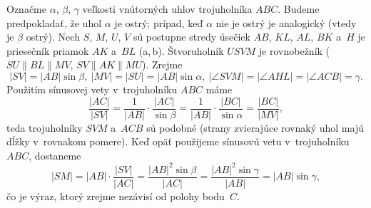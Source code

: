 {\ineriesenie
Označme $\alpha$, $\beta$, $\gamma$ veľkosti vnútorných uhlov trojuholníka $ABC$. Budeme predpokladať, že uhol $\alpha$ je ostrý; prípad, keď $\alpha$ nie je ostrý je analogický (vtedy je $\beta$ ostrý). Nech $S$, $M$, $U$, $V$ sú postupne stredy úsečiek $AB$, $KL$, $AL$, $BK$ a~$H$ je priesečník priamok $AK$ a~$BL$ (\obr{}a,\,b).
%
Štvoruholník $USV\!M$ je rovnobežník ($SU \parallel BL \parallel MV$, $SV \parallel AK \parallel MU$). Zrejme
$$
|SV| = |AB|\sin\beta, \ |MV|=|SU|=|AB|\sin\alpha, \ |\angle SVM| = |\angle AHL| = |\angle ACB| = \gamma.
$$
Použitím sínusovej vety v~trojuholníku $ABC$ máme
$$
\frac{|AC|}{|SV|}=\frac{1}{|AB|}\cdot\frac{|AC|}{\sin\beta}=\frac{1}{|AB|}\cdot\frac{|BC|}{\sin\alpha}=\frac{|BC|}{|MV|},
$$
teda trojuholníky $SVM$ a~$ACB$ sú podobné (strany zvierajúce rovnaký uhol majú dĺžky v~rovnakom pomere). Keď opäť použijeme sínusovú vetu v~trojuholníku $ABC$, dostaneme
$$
|SM|=|AB|\cdot\frac{|SV|}{|AC|}=\frac{|AB|^2\sin\beta}{|AC|}=\frac{|AB|^2\sin\gamma}{|AB|}=|AB|\sin\gamma,
$$
čo je výraz, ktorý zrejme nezávisí od polohy bodu~$C$.
}

